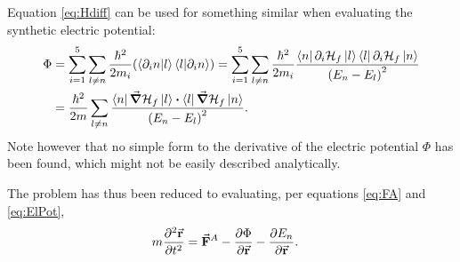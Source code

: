 \documentclass[a4paper]{article}
\begin{document}
Equation \ref{eq:Hdiff} can be used for something similar when evaluating the synthetic
electric potential:
\begin{align}\label{eq:ElPot}
        \Phi &= \sum_{i=1}^{5} \sum_{l \ne n} \frac{\hbar{}^2}{2m_i}\pqty{\bra{\partial_i
    n}\ket{l}\bra{l}\ket{\partial_i n}} = \sum_{i=1}^{5} \sum_{l \ne n}
    \frac{\hbar{}^2}{2m_i}\frac{\bra{n}\partial_i \mathbb{\cal H}_f\ket{l}\bra{l}\partial_i
    \mathbb{\cal H}_f\ket{n}}{\pqty{E_n-E_l}^2}\\
    &= \frac{\hbar{}^2}{2m}\sum_{l \ne n}^{} \frac{\bra{n}\grad \mathbb{\cal H}_f
    \ket{l}\vdot \bra{l}\grad\mathbb{\cal H}_f\ket{n}}{\pqty{E_n-E_l}^2}
.\end{align}
Note however that no simple form to the derivative of the electric potential \(\Phi\) has
been found, which might not be easily described analytically.

The problem has thus been reduced to evaluating, per equations \ref{eq:FA} and
\ref{eq:ElPot},
\begin{align}\label{eq:dynfin}
        m\frac{\partial^2 \va{r}}{\partial t^2} &= \va{F}^A-\frac{\partial \Phi}{\partial
        \va{r}} - \frac{\partial E_n}{\partial \va{r}} 
.\end{align}
\end{document}
